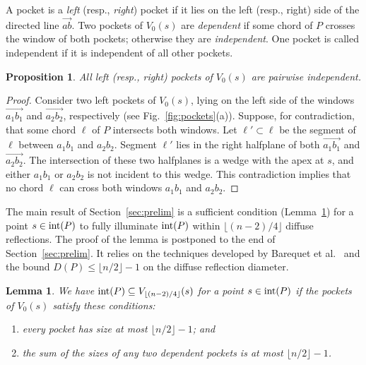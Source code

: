 \documentclass[12pt]{article}
\newcommand{\floor}[1]{{\lfloor #1 \rfloor}}
\newtheorem{lemma}{Lemma}
\newtheorem{proposition}{Proposition}
\begin{document}
A pocket is a \emph{left} (resp., \emph{right}) pocket if it lies on the left (resp., right) side of the directed line $\overrightarrow{ab}$. Two pockets of $V_0(s)$ are \emph{dependent} if some chord of $P$ crosses the window of both pockets; otherwise they are \emph{independent}.
One pocket is called independent if it is independent of all other pockets.

\begin{proposition} \label{prop:independent}
All left (resp., right) pockets of $V_0(s)$ are pairwise independent.
\end{proposition}


\begin{proof}
Consider two left pockets of $V_0(s)$, lying on the left side of the windows $\overrightarrow{a_1b_1}$ and $\overrightarrow{a_2b_2}$, respectively (see Fig.~\ref{fig:pockets}(a)). Suppose, for contradiction, that some chord $\ell$ of $P$ intersects both windows. Let $\ell'\subset \ell$ be the segment of $\ell$ between $a_1b_1$ and $a_2b_2$. Segment $\ell'$ lies in the right halfplane of both $\overrightarrow{a_1b_1}$ and $\overrightarrow{a_2b_2}$. The intersection of these two halfplanes is a wedge with the apex at $s$, and either $a_1b_1$ or $a_2b_2$ is not incident to this wedge.
This contradiction implies that no chord $\ell$ can cross both windows $a_1b_1$ and $a_2b_2$.
\end{proof}
The main result of Section~\ref{sec:prelim} is a sufficient condition (Lemma~\ref{lem:condition})
for a point $s\in {\rm int}(P)$ to fully illuminate ${\rm int}(P)$ within $\floor{(n-2)/4}$
diffuse reflections.
The proof of the lemma is postponed to the end of Section~\ref{sec:prelim}.
It relies on the techniques developed by Barequet et al.~\cite{Us} and the bound
$D(P)\leq \floor{n/2}-1$ on the diffuse reflection diameter.

\begin{lemma} \label{lem:condition}
We have ${\rm int}(P)\subseteq V_{\floor{(n-2)/4}}(s)$
for a point $s\in {\rm int}(P)$ if the pockets of $V_0(s)$
satisfy these conditions:
\begin{enumerate}\itemsep -2pt
  \item[$\mathbf{C}_1$] every pocket has size at most $\floor{n/2}-1$; and
  \item[$\mathbf{C}_2$] the sum of the sizes of any two dependent pockets is at most $\floor{n/2}-1$.
\end{enumerate}
\end{lemma}
\end{document}
